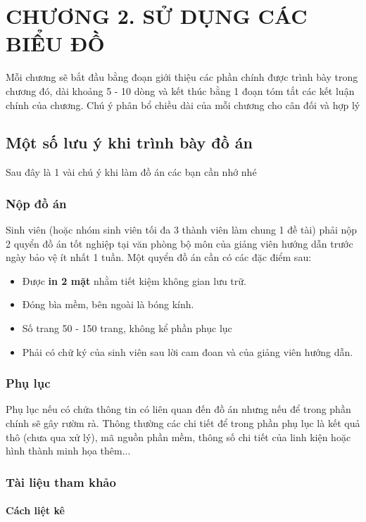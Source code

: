 \section*{\centering CHƯƠNG 2. SỬ DỤNG CÁC BIỂU ĐỒ}
\setcounter{section}{2}
\setcounter{subsection}{0}
\setcounter{figure}{0}
\setcounter{table}{0}
Mỗi chương sẽ bắt đầu bằng đoạn giới thiệu các phần chính được trình bày trong chương đó, dài khoảng 5 - 10 dòng và kết thúc bằng 1 đoạn tóm tắt các kết luận chính của chương. Chú ý phân bổ chiều dài của mỗi chương cho cân đối và hợp lý 
\subsection{Một số lưu ý khi trình bày đồ án}
Sau đây là 1 vài chú ý khi làm đồ án các bạn cần nhớ nhé
\subsubsection{Nộp đồ án}
Sinh viên (hoặc nhóm sinh viên tối đa 3 thành viên làm chung 1 đề tài) phải nộp 2 quyển đồ án tốt nghiệp tại văn phòng bộ môn của giảng viên hướng dẫn trước ngày bảo vệ ít nhất 1 tuần. Một quyển đồ án cần có các đặc điểm sau:
\begin{itemize}
    \item Được \textbf{in 2 mặt} nhằm tiết kiệm không gian lưu trữ.
    \item Đóng bìa mềm, bên ngoài là bóng kính. 
    \item Số trang 50 - 150 trang, không kể phần phục lục
    \item Phải có chữ ký của sinh viên sau lời cam đoan và của giảng viên hướng dẫn. 
\end{itemize}
\subsubsection{Phụ lục}
Phụ lục nếu có chứa thông tin có liên quan đến đồ án nhưng nếu để trong phần chính sẽ gây rườm rà. Thông thường các chi tiết để trong phần phụ lục là kết quả thô (chưa qua xử lý), mã nguồn phần mềm, thông số chi tiết của linh kiện hoặc hình thành minh họa thêm...
\subsubsection{Tài liệu tham khảo}
\paragraph{Cách liệt kê} \mbox{} %

